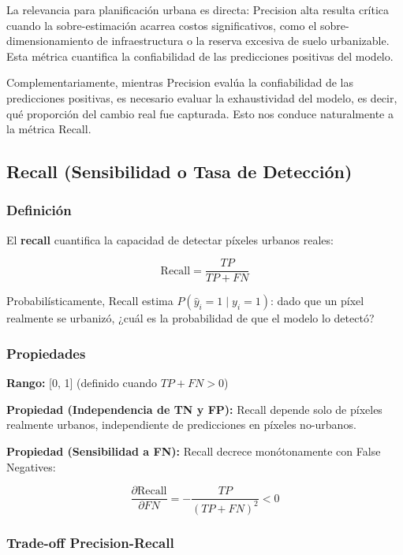 La relevancia para planificación urbana es directa: Precision alta resulta crítica cuando la sobre-estimación acarrea costos significativos, como el sobre-dimensionamiento de infraestructura o la reserva excesiva de suelo urbanizable. Esta métrica cuantifica la confiabilidad de las predicciones positivas del modelo.

Complementariamente, mientras Precision evalúa la confiabilidad de las predicciones positivas, es necesario evaluar la exhaustividad del modelo, es decir, qué proporción del cambio real fue capturada. Esto nos conduce naturalmente a la métrica Recall.

\subsection{Recall (Sensibilidad o Tasa de Detección)}

\subsubsection{Definición}

El \textbf{recall} cuantifica la capacidad de detectar píxeles urbanos reales:

\begin{equation}
\text{Recall} = \frac{TP}{TP + FN}
\label{eq:recall}
\end{equation}

Probabilísticamente, Recall estima $P(\hat{y}_i = 1 \mid y_i = 1)$: dado que un píxel realmente se urbanizó, ¿cuál es la probabilidad de que el modelo lo detectó?

\subsubsection{Propiedades}

\textbf{Rango:} [0, 1] (definido cuando $TP + FN > 0$)

\textbf{Propiedad (Independencia de TN y FP):} Recall depende solo de píxeles realmente urbanos, independiente de predicciones en píxeles no-urbanos.

\textbf{Propiedad (Sensibilidad a FN):} Recall decrece monótonamente con False Negatives:

\begin{equation}
\frac{\partial \text{Recall}}{\partial FN} = -\frac{TP}{(TP + FN)^2} < 0
\label{eq:rec_fn_sens}
\end{equation}

\subsubsection{Trade-off Precision-Recall}

